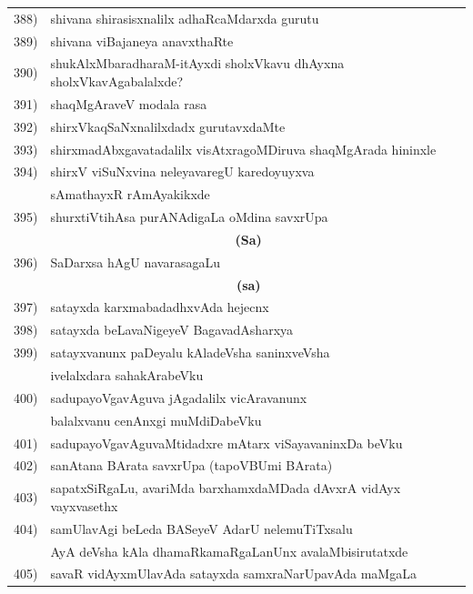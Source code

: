 {\begin{longtable}{@{}cp{7.4cm}r}
 388) & shivana shirasisxnalilx adhaRcaMdarxda gurutu & \pageref{page172}\\
 389) & shivana viBajaneya anavxthaRte & \pageref{page126}\\ 
 390) & shukAlxMbaradharaM-itAyxdi sholxVkavu dhAyxna sholxVkavAgabalalxde? & \pageref{page206}\\
 391) & shaqMgAraveV modala rasa & \pageref{page227}\\
 392) & shirxVkaqSaNxnalilxdadx gurutavxdaMte & \pageref{page107}\\
 393) & shirxmadAbxgavatadalilx visAtxragoMDiruva shaqMgArada hininxle & \pageref{page228}\\
 394) & shirxV viSuNxvina neleyavaregU karedoyuyxva & \\
      &  sAmathayxR rAmAyakikxde & \pageref{page238}\\
 395) & shurxtiVtihAsa purANAdigaLa oMdina savxrUpa & \pageref{page187}\\[0.3cm] 
      & \multicolumn{1}{c}{\textbf{(Sa)}} & \\[0.3cm]
 396) & SaDarxsa hAgU navarasagaLu & \pageref{page223}\\[0.3cm]
       & \multicolumn{1}{c}{\textbf{(sa)}} & \\[0.3cm] 
 397) & satayxda karxmabadadhxvAda hejecnx & \pageref{page76} \\
 398) & satayxda beLavaNigeyeV BagavadAsharxya & \pageref{page72}\\
 399) & satayxvanunx paDeyalu kAladeVsha saninxveVsha & \\
      & ivelalxdara sahakArabeVku & \pageref{page109}\\
400) & sadupayoVgavAguva jAgadalilx vicAravanunx & \\
     &  balalxvanu cenAnxgi muMdiDabeVku & \pageref{page248}\\ 
401) & sadupayoVgavAguvaMtidadxre mAtarx viSayavaninxDa beVku & \pageref{page252}\\
402) & sanAtana BArata savxrUpa (tapoVBUmi BArata) & \pageref{page103}\\
403) & sapatxSiRgaLu, avariMda barxhamxdaMDada dAvxrA vidAyx vayxvasethx & \pageref{page92}\\
404) & samUlavAgi beLeda BASeyeV AdarU nelemuTiTxsalu & \\
     & AyA deVsha kAla dhamaRkamaRgaLanUnx avalaMbisirutatxde & \pageref{page196}\\
405) & savaR vidAyxmUlavAda satayxda samxraNarUpavAda maMgaLa & \pageref{page20}\\

\end{longtable}}
